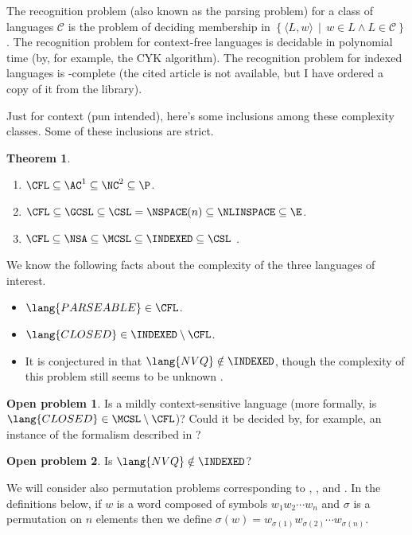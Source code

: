 \documentclass[draft]{article}
\newtheorem{theorem}{Theorem}
\theoremstyle{remark} \newtheorem{technicality}{Technical note}
\theoremstyle{definition} \newtheorem{definition}{Definition}
\theoremstyle{definition} \newtheorem{openproblem}{Open problem}
\newcommand{\pair}[2]{\langle#1,#2\rangle} %
\newcommand{\lb}{\left\{} %
\newcommand{\rb}{\right\}} %
\newcommand{\st}{\,\middle|\,} %
\begin{document}
The recognition problem (also known as the parsing problem) for a class of languages $\mathcal{C}$ is the problem of deciding membership in $\lb\pair{L}{w}\st w\in L \land L\in\mathcal{C} \rb$.
The recognition problem for context-free languages is decidable in polynomial time (by, for example, the CYK algorithm).
The recognition problem for indexed languages is \EXP-complete \cite{tk86} (the cited article is not available, but I have ordered a copy of it from the library).

Just for context (pun intended), here's some inclusions among these complexity classes.
Some of these inclusions are strict.
\begin{theorem}\mbox{}
  \begin{enumerate}
  \item $\CFL\subseteq\AC^1\subseteq\NC^2\subseteq\P$.
  \item $\CFL\subseteq\GCSL\subseteq\CSL=\NSPACE(n)\subseteq\NLINSPACE\subseteq\E$.
  \item $\CFL\subseteq\NSA\subseteq\MCSL\subseteq\INDEXED\subseteq\CSL$ \cite{hu79}.
  \end{enumerate}
\end{theorem}

We know the following facts about the complexity of the three languages of interest.
\begin{itemize}
\item $\lang{PARSEABLE}\in\CFL$.
\item $\lang{CLOSED}\in\INDEXED\setminus\CFL$. \cite{mp84}
\item It is conjectured in \cite{mp84} that $\lang{NVQ}\notin\INDEXED$, though the complexity of this problem still seems to be unknown \cite{potts}.
\end{itemize}

\begin{openproblem}
  Is  a mildly context-sensitive language (more formally, is $\lang{CLOSED}\in\MCSL\setminus\CFL$)? Could it be decided by, for example, an instance of the formalism described in \cite{kallmeyer}?
\end{openproblem}

\begin{openproblem}
  Is $\lang{NVQ}\notin\INDEXED$?
\end{openproblem}

We will consider also permutation problems corresponding to , , and .
In the definitions below, if $w$ is a word composed of symbols $w_1w_2\cdots w_n$ and $\sigma$ is a permutation on $n$ elements then we define $\sigma(w)=w_{\sigma(1)}w_{\sigma(2)}\cdots w_{\sigma(n)}$.
\end{document}
